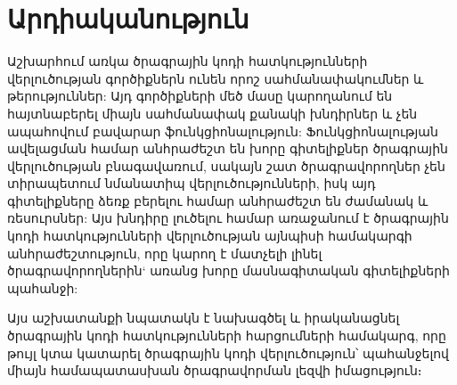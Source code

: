 {
    \section{Արդիականություն}\label{sec:modernity}
    Աշխարհում առկա ծրագրային կոդի հատկությունների վերլուծության գործիքներն ունեն որոշ սահմանափակումներ և թերություններ:
    Այդ գործիքների մեծ մասը կարողանում են հայտնաբերել միայն սահմանափակ քանակի խնդիրներ և չեն ապահովում բավարար
    ֆունկցիոնալություն: Ֆունկցիոնալության ավելացման համար անհրաժեշտ են խորը գիտելիքներ ծրագրային վերլուծության
    բնագավառում, սակայն շատ ծրագրավորողներ չեն տիրապետում նմանատիպ վերլուծությունների, իսկ այդ գիտելիքները ձեռք բերելու
    համար անհրաժեշտ են ժամանակ և ռեսուրսներ: Այս խնդիրը լուծելու համար առաջանում է ծրագրային կոդի հատկությունների
    վերլուծության այնպիսի համակարգի անհրաժեշտություն, որը կարող է մատչելի լինել ծրագրավորողներին` առանց խորը մասնագիտական
    գիտելիքների պահանջի:

    Այս աշխատանքի նպատակն է նախագծել և իրականացնել ծրագրային կոդի հատկությունների
    հարցումների համակարգ, որը թույլ կտա կատարել ծրագրային կոդի վերլուծություն՝ պահանջելով միայն համապատասխան ծրագրավորման լեզվի իմացություն։
}
